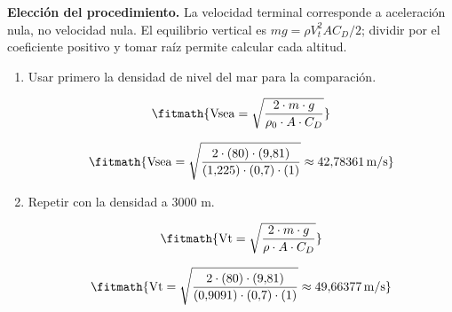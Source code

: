 \noindent\textbf{Elección del procedimiento.} La velocidad terminal corresponde a aceleración nula, no velocidad nula. El equilibrio vertical es $mg=\rho V_t^2AC_D/2$; dividir por el coeficiente positivo y tomar raíz permite calcular cada altitud.

\begin{enumerate}

\item Usar primero la densidad de nivel del mar para la comparación.

\[\fitmath{\mathrm{Vsea}=\sqrt{\frac{2\cdot m\cdot g}{\rho_{0}\cdot A\cdot C_D}}}\]

\[\fitmath{\mathrm{Vsea}=\sqrt{\frac{2\cdot (80)\cdot (9{,}81)}{(1{,}225)\cdot (0{,}7)\cdot (1)}}\approx 42{,}78361\,\mathrm{m/s}}\]

\item Repetir con la densidad a 3000 m.

\[\fitmath{\mathrm{Vt}=\sqrt{\frac{2\cdot m\cdot g}{\rho\cdot A\cdot C_D}}}\]

\[\fitmath{\mathrm{Vt}=\sqrt{\frac{2\cdot (80)\cdot (9{,}81)}{(0{,}9091)\cdot (0{,}7)\cdot (1)}}\approx 49{,}66377\,\mathrm{m/s}}\]

\end{enumerate}
